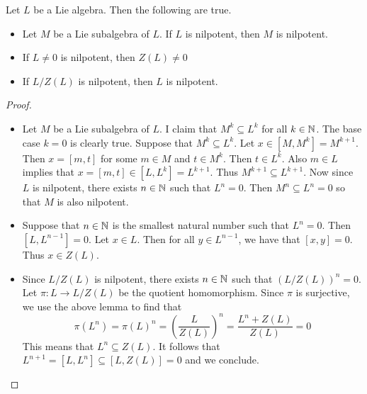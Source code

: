 \documentclass[a4paper]{article}
\begin{document}
\begin{lmm}{}{} Let $L$ be a Lie algebra. Then the following are true. 
\begin{itemize}
\item Let $M$ be a Lie subalgebra of $L$. If $L$ is nilpotent, then $M$ is nilpotent. 
\item If $L\neq 0$ is nilpotent, then $Z(L)\neq 0$
\item If $L/Z(L)$ is nilpotent, then $L$ is nilpotent. 
\end{itemize} \tcbline
\begin{proof}~\\
\begin{itemize}
\item Let $M$ be a Lie subalgebra of $L$. I claim that $M^k\subseteq L^k$ for all $k\in\mathbb{N}$. The base case $k=0$ is clearly true. Suppose that $M^k\subseteq L^k$. Let $x\in[M,M^k]=M^{k+1}$. Then $x=[m,t]$ for some $m\in M$ and $t\in M^k$. Then $t\in L^k$. Also $m\in L$ implies that $x=[m,t]\in[L,L^k]=L^{k+1}$. Thus $M^{k+1}\subseteq L^{k+1}$. Now since $L$ is nilpotent, there exists $n\in\mathbb{N}$ such that $L^n=0$. Then $M^n\subseteq L^n=0$ so that $M$ is also nilpotent. 
\item Suppose that $n\in\mathbb{N}$ is the smallest natural number such that $L^n=0$. Then $[L,L^{n-1}]=0$. Let $x\in L$. Then for all $y\in L^{n-1}$, we have that $[x,y]=0$. Thus $x\in Z(L)$. 
\item Since $L/Z(L)$ is nilpotent, there exists $n\in\mathbb{N}$ such that $(L/Z(L))^n=0$. Let $\pi:L\to L/Z(L)$ be the quotient homomorphism. Since $\pi$ is surjective, we use the above lemma to find that $$\pi(L^n)=\pi(L)^n=\left(\frac{L}{Z(L)}\right)^n=\frac{L^n+Z(L)}{Z(L)}=0$$ This means that $L^n\subseteq Z(L)$. It follows that $L^{n+1}=[L,L^n]\subseteq[L,Z(L)]=0$ and we conclude. 
\end{itemize}
\end{proof}
\end{lmm}
\end{document}
